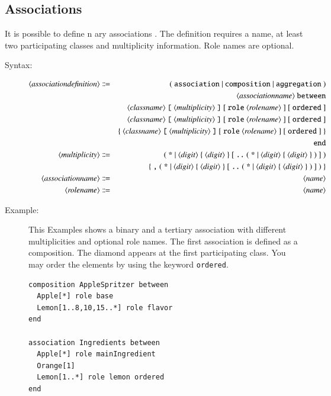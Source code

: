 \documentclass[a4paper,titlepage,oneside,final]{scrreprt} %
\begin{document}
\subsection{Associations}
It is possible to define n ary associations . The definition requires a name,
at least two participating classes and multiplicity information. Role names are optional.
\begin{description}
\item[Syntax:]
\begin{eqnarray*}
\langle\mathit{associationdefinition}\rangle &\Coloneqq&
(~\verb+association+~|~\verb+composition+~|~\verb+aggregation+~)\\
&&\langle\mathit{associationname}\rangle~\verb+between+\\
&&\langle\mathit{classname}\rangle~\verb+[+~\langle\mathit{multiplicity}\rangle~
\verb+]+~[~\verb+role+~\langle\mathit{rolename}\rangle~]~[~\verb+ordered+~]\\
&&\langle\mathit{classname}\rangle~\verb+[+~\langle\mathit{multiplicity}\rangle~
\verb+]+~[~\verb+role+~\langle\mathit{rolename}\rangle~]~[~\verb+ordered+~]\\
&&\{~\langle\mathit{classname}\rangle~\verb+[+~\langle\mathit{multiplicity}\rangle~
\verb+]+~[~\verb+role+~\langle\mathit{rolename}\rangle~]~[~\verb+ordered+~]~\}\\
&&\verb+end+\\
\langle\mathit{multiplicity}\rangle &\Coloneqq&
(~\verb+*+~|~\langle\mathit{digit}\rangle~\{~\langle\mathit{digit}\rangle~\}~
[~\verb+..+~(~\verb+*+~|~\langle\mathit{digit}\rangle~\{~\langle\mathit{digit}\rangle~\}~)~]~)\\
&& \{~\verb+,+~(~\verb+*+~|~\langle\mathit{digit}\rangle~\{~\langle\mathit{digit}\rangle~\}~
[~\verb+..+~(~\verb+*+~|~\langle\mathit{digit}\rangle~\{~\langle\mathit{digit}\rangle~\}~)~]~)~\}\\
\langle\mathit{associationname}\rangle &\Coloneqq& \langle\mathit{name}\rangle\\
\langle\mathit{rolename}\rangle &\Coloneqq& \langle\mathit{name}\rangle
\end{eqnarray*}
\item[Example:] This Examples shows a binary and a tertiary association with different
multiplicities and optional role names. The first association is defined as
a composition. The diamond appears at the first participating class.
You may order the elements by using
the keyword \verb+ordered+.
\begin{verbatim}
composition AppleSpritzer between
  Apple[*] role base
  Lemon[1..8,10,15..*] role flavor
end

association Ingredients between
  Apple[*] role mainIngredient
  Orange[1]
  Lemon[1..*] role lemon ordered
end
\end{verbatim}
\end{description}
\end{document}
